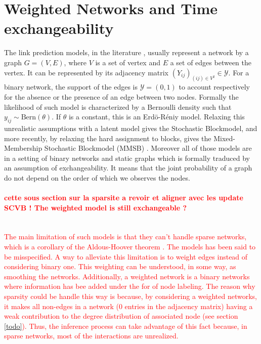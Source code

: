
\section{Weighted Networks and Time exchangeability}

The link prediction models, in the literature \cite{goldenberg2010survey,lu2011link}, usually represent a network by a graph $G=(V,E)$, where $V$ is a set of vertex and $E$ a set of edges between the vertex. It can be represented by its adjacency matrix $(Y_{ij})_{(ij) \in V^2} \in \mathcal{Y}$. For a binary network, the support of the edges is $\mathcal{Y} = (0,1)$ to account respectively for the absence or the presence of an edge between two nodes. Formally the likelihood of such model is characterized by a Bernoulli density such that $y_{ij} \sim \mathrm{Bern}(\theta)$. If $\theta$ is a constant, this is an Erd\"o-R\'eniy model. Relaxing this unrealistic assumptions with a latent model gives the Stochastic Blockmodel, and more recently, by relaxing the hard assignment to blocks, gives the Mixed-Membership Stochastic Blockmodel (MMSB) \cite{MMSB}. Moreover all of those models are in a setting of binary networks and  static graphs which is formally traduced by an assumption of exchangeability. It means that the joint probability of a graph do not depend on the order of which we observes the nodes. %

\textcolor{red}{\paragraph{cette sous section sur la sparsite a revoir et aligner avec les update SCVB ! The weighted model is still exchangeable ?}~\\
The main limitation of such models is that they can't handle sparse networks, which is a corollary of the Aldous-Hoover theorem \cite{orbanz2015bayesian}. The models has been said to be misspecified. A way to alleviate this limitation is to weight edges instead of considering binary one. This weighting can be understood, in some way, as smoothing the networks. Additionally, a weighted network is a binary networks where information has bee added under the for of node labeling. The reason why sparsity could be handle this way is because, by considering a weighted networks, it makes all non-edges in a network (0 entries in the adjacency matrix) having a weak contribution to the degree distribution of associated node (see section \ref{todo}). Thus, the inference process can take advantage of this fact because, in sparse networks, most of the interactions are unrealized.}

